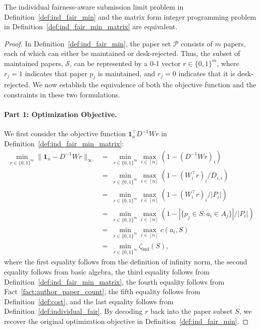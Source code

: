 \begin{proposition}\label{prop:equiv_individual_append}
    The individual fairness-aware submission limit problem in Definition~\ref{def:ind_fair_min} and the matrix form integer programming problem in Definition~\ref{def:ind_fair_min_matrix} are equivalent.
\end{proposition}
\begin{proof}
    In Definition~\ref{def:ind_fair_min}, the paper set $\mathcal{P}$ consists of $m$ papers, each of which can either be maintained or desk-rejected. Thus, the subset of maintained papers, $\mathcal{S}$, can be represented by a 0-1 vector $r \in \{0, 1\}^m$, where $r_j = 1$ indicates that paper $p_j$ is maintained, and $r_j = 0$ indicates that it is desk-rejected. We now establish the equivalence of both the objective function and the constraints in these two formulations.


    \paragraph{Part 1: Optimization Objective.} We first consider the objective function $\mathbf{1}^\top_nD^{-1}Wr$ in Definition~\ref{def:ind_fair_min_matrix}:
    \begin{align*}
        \min_{r \in \{0,1\}^m} \| \mathbf{1}_n - D^{-1}Wr\|_\infty &=~ \min_{r \in \{0,1\}^m} \max_{i\in[n]} (1 - (D^{-1}Wr)_i) \\ 
        &=~ \min_{r \in \{0,1\}^m} \max_{i\in[n]} (1 - (W_i^\top r)_i/D_{i,i}) \\
        &=~ \min_{r \in \{0,1\}^m} \max_{i\in[n]} (1 - (W_i^\top r)_i/|P_i|) \\ 
        &=~ \min_{r \in \{0,1\}^m} \max_{i\in[n]} (1 - |\{p_j \in  S : a_i \in A_j\}|/|P_i|) \\ 
        &=~ \min_{r \in \{0,1\}^m} \max_{i\in[n]}c(a_i, S) \\ 
        &=~ \min_{r \in \{0,1\}^m} \zeta_{\mathrm{ind}}(S),
    \end{align*}
where the first equality follows from the definition of infinity norm, the second equality follows from basic algebra, the third equality follows from Definition~\ref{def:ind_fair_min_matrix}, the fourth equality follows from Fact~\ref{fact:author_paper_count}, the fifth equality follows from Definition~\ref{def:cost}, and the last equality follows from Definition~\ref{def:individual_fair}. By decoding $r$ back into the paper subset $S$, we recover the original optimization objective in Definition~\ref{def:ind_fair_min}.


\end{proof}
